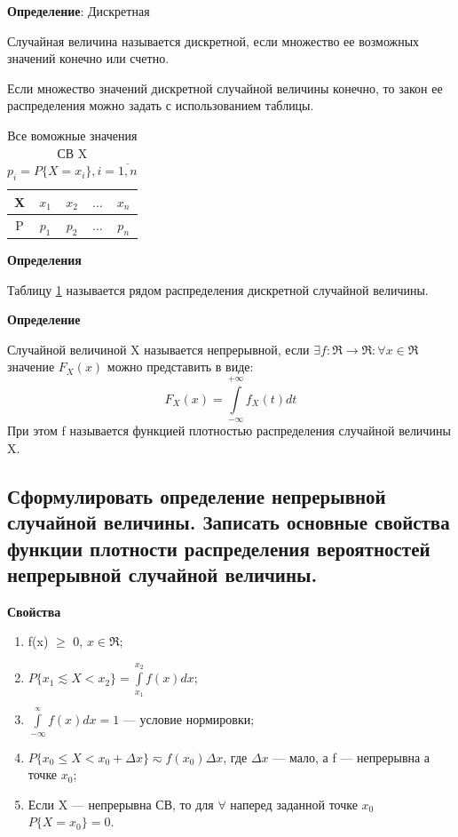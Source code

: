 \textbf{Определение}: Дискретная

Случайная величина называется дискретной, если множество ее возможных значений конечно или счетно.

Если множество значений дискретной случайной величины конечно, то закон ее распределения можно задать с использованием таблицы.
\begin{table}[ht!]
	\begin{center}
		\caption{Все воможные значения СВ X $p_i = P\{X=x_i\}, i = \overline{1,n}$}
		\label{tbl:best}
		\begin{tabular}{|c|c|c|c|c|}
			\hline
			X & $x_1$ & $x_2$ & $\dots$ & $x_n$ \\ 
			\hline
			P & $p_1$ & $p_2$ & $\dots$ & $p_n$ \\
			\hline
		\end{tabular}
	\end{center}
\end{table}

\textbf{Определения}

Таблицу \ref{tbl:best} называется рядом распределения дискретной случайной величины.

\textbf{Определение}

Случайной величиной X называется непрерывной, если $\exists f: \Re \rightarrow \Re: \forall x \in \Re$ значение $F_X(x)$ можно представить в виде:
\begin{equation}
	F_X(x) = \int\limits_{-\infty}^{+\infty} f_X(t)dt
\end{equation}
При этом f называется функцией плотностью распределения случайной величины X.

\subsection{Сформулировать определение непрерывной случайной величины. Записать основные свойства функции плотности распределения вероятностей непрерывной случайной величины.}

\textbf{Свойства}

\begin{enumerate}[label=\arabic*.]
	\item f(x) $\geq$ 0, $x \in \Re$;
	\item $P\{x_1 \lesssim X < x_2\} = \int\limits_{x_1}^{x_2}f(x)dx$;
	\item $\int\limits_{-\infty}^{_\infty}f(x)dx = 1$ --- условие нормировки;
	\item $P\{x_0 \leq X < x_0 + \Delta x\} \eqsim f(x_0)\Delta x$, где $\Delta x$ --- мало, а f --- непрерывна а точке $x_0$;
	\item Если X --- непрерывна СВ, то для $\forall$ наперед заданной точке $x_0$ $P\{X=x_0\}=0$.
\end{enumerate}


